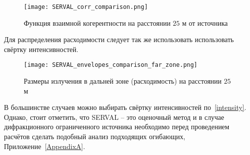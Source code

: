 \begin{figure}[H] 
	\centering 	\texttt{[image: SERVAL\_corr\_comparison.png]}
	\caption{Функция взаимной когерентности на расстоянии $25$ м от источника}
	\label{fig:SERVAL_corr_comparison}
\end{figure}
\noindent Для распределения расходимости следует так же использовать использовать свёртку интенсивностей.
\begin{figure}[H] 
	\centering 	\texttt{[image: SERVAL\_envelopes\_comparison\_far\_zone.png]}
	\caption{Размеры излучения в дальней зоне (расходимость) на расстоянии $25$ м}
	\label{fig:SERVAL_envelopes_comparison_far_zone}
\end{figure}
В большинстве случаев можно выбирать свёртку интенсивностей по~\ref{intensity}. Однако, стоит отметить, что SERVAL -- это оценочный метод и в случае дифракционного ограниченного источника необходимо перед проведением расчётов сделать подобный анализ подходящих огибающих, Приложение~\ref{AppendixA}.

